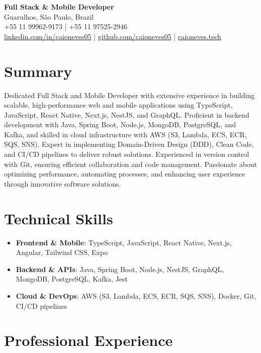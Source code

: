 \documentclass[11pt,letterpaper]{article}
\begin{document}
\begin{center}
    \textbf{\Large Full Stack \& Mobile Developer} \\
    \vspace{5pt}
    Guarulhos, São Paulo, Brazil \\
    +55 11 99962-9173 | +55 11 97525-2946 \\
    \href{https://www.linkedin.com/in/caioneves05}{linkedin.com/in/caioneves05} |
    \href{https://github.com/caioneves05}{github.com/caioneves05} |
    \href{http://caioneves.tech}{caioneves.tech}
\end{center}

\section{Summary}
Dedicated Full Stack and Mobile Developer with extensive experience in building scalable, high-performance web and mobile applications using TypeScript, JavaScript, React Native, Next.js, NestJS, and GraphQL. Proficient in backend development with Java, Spring Boot, Node.js, MongoDB, PostgreSQL, and Kafka, and skilled in cloud infrastructure with AWS (S3, Lambda, ECS, ECR, SQS, SNS). Expert in implementing Domain-Driven Design (DDD), Clean Code, and CI/CD pipelines to deliver robust solutions. Experienced in version control with Git, ensuring efficient collaboration and code management. Passionate about optimizing performance, automating processes, and enhancing user experience through innovative software solutions.

\section{Technical Skills}
\begin{itemize}[leftmargin=*]
    \item \textbf{Frontend \& Mobile}: TypeScript, JavaScript, React Native, Next.js, Angular, Tailwind CSS, Expo
    \item \textbf{Backend \& APIs}: Java, Spring Boot, Node.js, NestJS, GraphQL, MongoDB, PostgreSQL, Kafka, Jest
    \item \textbf{Cloud \& DevOps}: AWS (S3, Lambda, ECS, ECR, SQS, SNS), Docker, Git, CI/CD pipelines
\end{itemize}

\section{Professional Experience}
\end{document}
